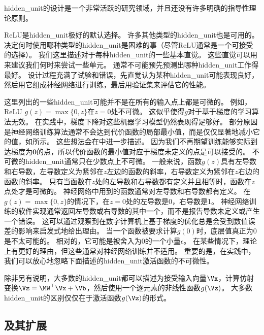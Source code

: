 
\gls{hidden_unit}的设计是一个非常活跃的研究领域，并且还没有许多明确的指导性理论原则。

\gls{ReLU}是\gls{hidden_unit}极好的默认选择。
许多其他类型的\gls{hidden_unit}也是可用的。
决定何时使用哪种类型的\gls{hidden_unit}是困难的事（尽管\gls{ReLU}通常是一个可接受的选择）。
我们这里描述对于每种\gls{hidden_unit}的一些基本直觉。
这些直觉可以用来建议我们何时来尝试一些单元。
通常不可能预先预测出哪种\gls{hidden_unit}工作得最好。
设计过程充满了试验和错误，先直觉认为某种\gls{hidden_unit}可能表现良好，然后用它组成神经网络进行训练，最后用验证集来评估它的性能。

这里列出的一些\gls{hidden_unit}可能并不是在所有的输入点上都是可微的。
例如，\gls{ReLU} $g(z)=\max\{0, z\}$在$z=0$处不可微。
这似乎使得$g$对于基于梯度的学习算法无效。
在实践中，梯度下降对这些机器学习模型仍然表现得足够好。
部分原因是神经网络训练算法通常不会达到代价函数的局部最小值，而是仅仅显著地减小它的值，如所示。
这些想法会在中进一步描述。
因为我们不再期望训练能够实际到达梯度为$\bm{0}$的点，所以代价函数的最小值对应于梯度未定义的点是可以接受的。
不可微的\gls{hidden_unit}通常只在少数点上不可微。
一般来说，函数$g(z)$具有左导数和右导数，左导数定义为紧邻在$z$左边的函数的斜率，右导数定义为紧邻在$z$右边的函数的斜率。
只有当函数在$z$处的左导数和右导数都有定义并且相等时，函数在$z$点处才是可微的。
神经网络中用到的函数通常对左导数和右导数都有定义。
在$g(z)=\max\{0,z\}$的情况下，在$z=0$处的左导数是0，右导数是1。
神经网络训练的软件实现通常返回左导数或右导数的其中一个，而不是报告导数未定义或产生一个错误。
这可以通过观察到在数字计算机上基于梯度的优化总是会受到数值误差的影响来启发式地给出理由。
当一个函数被要求计算$g(0)$时，底层值真正为0 是不太可能的。
相对的，它可能是被舍入为0的一个小量$\epsilon$。
在某些情况下，理论上有更好的理由，但这些通常对神经网络训练并不适用。
重要的是，在实践中，我们可以放心地忽略下面描述的\gls{hidden_unit}激活函数的不可微性。


除非另有说明，大多数的\gls{hidden_unit}都可以描述为接受输入向量$\Vx$，计算仿射变换$\Vz=\MW^\top \Vx+\Vb$，然后使用一个逐元素的非线性函数$g(\Vz)$。
大多数\gls{hidden_unit}的区别仅仅在于激活函数$g(\Vz)$的形式。

\subsection{及其扩展}
\label{sec:rectified_linear_units_and_their_generalizations}

